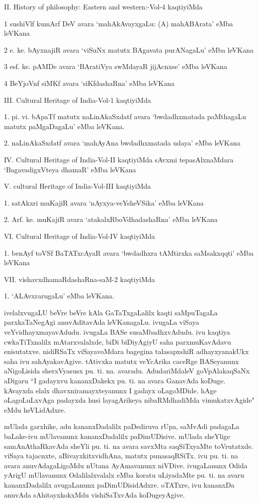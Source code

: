 {\rm II. History of philosophy: Eastern and western:-Vol-4} kaqtiyiMda

{\rm 1} sushiVlf kumArf DeV avara `mahAkAvayxgaLu: (A) mahABArata'  eMba leVKana

{\rm 2} e. ke. bAyxnajiR avara `viSuNx matutx BAgavata purANagaLu' eMba leVKana

{\rm 3} esf. ke. pAMDe avara `BAratiVya swMdayaR jijAcnxse' eMba leVKana

{\rm 4} BeYjoVnf siMKf avara `siKfdashaRna' eMba leVKana

{\rm III. Cultural Heritage of India-Vol-1} kaqtiyiMda

{\rm 1.} pi. vi. bApaTf matutx naLinAkaSxdatf avara `bwdadhxmatada paMthagaLu matutx paMgaDagaLu' eMba leVKana.

{\rm 2.} naLinAkaSxdatf avara `mahAyAna bwdadhxmatada udaya' eMba leVKana

{\rm IV. Cultural Heritage of India-Vol-II} kaqtiyiMda sAvxmi tepasAlxnaMdara `BagavadigxVteya dhamaR' eMba leVKana

{\rm V. cultural Heritage of India-Vol-III} kaqtiyiMda

{\rm 1.} satAkxri muKajiR avara `nAyxya-veYsheVSika' eMba leVKana 

{\rm 2.} Arf. ke. muKajiR avara `atakalxRboVdhadashaRna' eMba leVKana

{\rm VI. Cultural Heritage of India-Vol-IV} kaqtiyiMda 

{\rm 1.} benAyf toVSf BaTATxcAyaR avara `bwdadhxra tAMtirxka saMsakxqqti' eMba leVKana

{\rm VII.} vishavxdhamaRdashaRna-saM-2 kaqtiyiMda

{\rm 1.} `ALAvxrarugaLu' eMba leVKana.

ivelalxvugaLU beVre beVre kAla GaTaTxgaLalilx kaqti saMpuTagaLa parxkaTaNegAgi anuvAditavAda leVKanagaLu. ivugaLa viSaya veYvidhayxmayavAdudu. ivugaLa BASe susaMbadhxvAdudu. ivu kaqtiya cwkaTiTxnalilx mAtarxvalalxde, biDi biDiyAgiyU saha parxmuKavAdavu enisutatxve. nidiRSaTx viSayavoMdara bagegina talasapxshiR adhayxyanakUkx saha ivu sahAyakavAgive. tAtivxka matutx veYcArika caceRge BASeyanunx aNigoLisida sherxVyasusx pu. ti. na. avaradu. AdudariMdaleV goVpAlakaqSaNx aDigaru ``I gadayxvu kananxDakekx pu. ti. na avara GanavAda koDuge. kAvayxda elalx dhavxniramayxteyanunx I gadayx oLagoMDide. hAge oLagoLuLxvAga padayxda husi layagArikeya nibaRMdhadiMda vimukatxvAgide" eMdu heVLidAdxre.

mUlada garxhike, adu kananxDadalilx paDediruva rUpa, saMvAdi padagaLa baLake-ivu mUlavanunx kananxDadalilx paDimUDisive. mUlada sheYlige samAnAthaRkavAda sheYli pu. ti. na avara savxMta saqSiTxyaMte toVrutatxde. viSaya tajacnxte, aBivayxkitxvidhAna, matutx punasaqRSiTx. ivu pu. ti. na avara anuvAdagaLigoMdu nUtana AyAmavanunx niVDive. ivugaLanunx Odida yArigU mUlavanunx Odalilalxvalalx eMba koratu uLiyadaMte pu. ti. na avaru kananxDadalilx avugaLanunx paDimUDisidAdxre. oTATxre, ivu kananxDa anuvAda sAhitayxkokxMdu vishiSaTxvAda koDugeyAgive.

